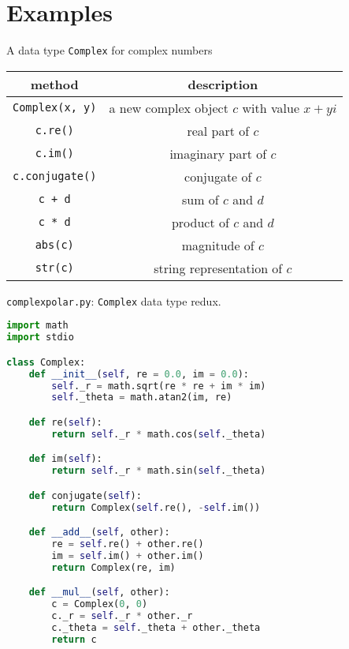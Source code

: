 \documentclass[8pt,a4paper,compress]{beamer}
\begin{document}
\section{Examples}
\begin{frame}[fragile]
\pause

A data type \lstinline{Complex} for complex numbers
\begin{center}
\begin{tabular}{cc}
method & description \\ \hline
\lstinline$Complex(x, y)$ & a new complex object $c$ with value $x + yi$ \\
\lstinline$c.re()$ & real part of $c$ \\
\lstinline$c.im()$ & imaginary part of $c$ \\
\lstinline$c.conjugate()$ & conjugate of $c$ \\
\lstinline$c + d$ & sum of $c$ and $d$ \\
\lstinline$c * d$ & product of $c$ and $d$ \\
\lstinline$abs(c)$ & magnitude of $c$ \\
\lstinline$str(c)$ & string representation of $c$
\end{tabular} 
\end{center}
\end{frame}

\begin{frame}[fragile]
\pause

\begin{framed}
\tiny \lstinline{complexpolar.py}: \lstinline{Complex} data type redux. 
\end{framed}

\begin{lstlisting}[language=Python]
import math
import stdio

class Complex:
    def __init__(self, re = 0.0, im = 0.0):
        self._r = math.sqrt(re * re + im * im)
        self._theta = math.atan2(im, re)

    def re(self):
        return self._r * math.cos(self._theta)

    def im(self):
        return self._r * math.sin(self._theta)

    def conjugate(self):
        return Complex(self.re(), -self.im())

    def __add__(self, other):
        re = self.re() + other.re()
        im = self.im() + other.im()
        return Complex(re, im)

    def __mul__(self, other):
        c = Complex(0, 0)
        c._r = self._r * other._r
        c._theta = self._theta + other._theta
        return c
\end{lstlisting}
\end{frame}
\end{document}
